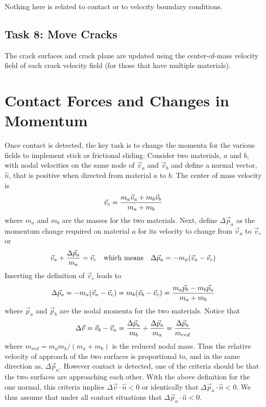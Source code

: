 \documentclass[11pt]{article}
\begin{document}
Nothing here is related to contact or to velocity boundary conditions.

\subsection{Task 8: Move Cracks}

The crack surfaces and crack plane are updated using the center-of-mass velocity field of each crack velocity field (for those that have multiple materials).

\section{Contact Forces and Changes in Momentum}

Once contact is detected, the key task is to change the momenta for the various fields to implement stick or frictional sliding. Consider two materials, $a$ and $b$, with nodal velocities on the same node of $\vec v_a$ and $\vec v_b$ and define a normal vector, $\hat n$, that is positive when directed from material $a$ to $b$. The center of mass velocity is
\begin{equation}
     \vec v_c = {m_a \vec v_a + m_b \vec v_b\over m_a + m_b}
\end{equation}
where $m_a$ and $m_b$ are the masses for the two materials. Next, define $\Delta\vec p_a$ as the momentum change required on material $a$ for its velocity to change from $\vec v_a$ to $\vec v_c$ or
\begin{equation}
         \vec v_a + {\Delta\vec p_a\over m_a} = \vec v_c \quad{\rm which\ means}\quad  \Delta \vec p_a = -m_a(\vec v_a -\vec v_c)
\end{equation}
Inserting the definition of $\vec v_c$ leads to
\begin{equation}
       \Delta \vec p_a = -m_a(\vec v_a -\vec v_c) = m_b (\vec v_b -\vec v_c) = {m_a\vec p_b-m_b\vec p_a\over m_a+m_b}
\end{equation}
where $\vec p_a$ and $\vec p_b$ are the nodal momenta for the two materials. Notice that
\begin{equation}
    \Delta \vec v = \vec v_b - \vec v_a = {\Delta \vec p_a\over m_b} + {\Delta \vec p_a\over m_a} = {\Delta\vec p_a\over m_{red}}
\end{equation}
where $m_{red} = m_a m_b/(m_a+m_b)$ is the reduced nodal mass. Thus the relative velocity of approach of the two surfaces is proportional to, and in the same direction as, $\Delta \vec p_a$. However contact is detected, one of the criteria should be that the two surfaces are approaching each other. With the above definition for the one normal, this criteria implies $\Delta\vec v\cdot\hat n<0$ or identically that $\Delta\vec p_a\cdot\hat n<0$. We thus assume that under all contact situations that $\Delta\vec p_a\cdot\hat n<0$.
\end{document}
